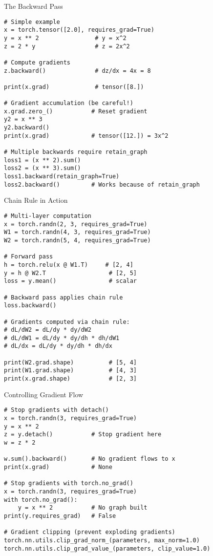 \documentclass[aspectratio=169,10pt]{beamer}
\begin{document}
\begin{frame}[fragile]{The Backward Pass}
\begin{lstlisting}
# Simple example
x = torch.tensor([2.0], requires_grad=True)
y = x ** 2                # y = x^2
z = 2 * y                 # z = 2x^2

# Compute gradients
z.backward()              # dz/dx = 4x = 8

print(x.grad)             # tensor([8.])

# Gradient accumulation (be careful!)
x.grad.zero_()           # Reset gradient
y2 = x ** 3
y2.backward()
print(x.grad)            # tensor([12.]) = 3x^2

# Multiple backwards require retain_graph
loss1 = (x ** 2).sum()
loss2 = (x ** 3).sum()
loss1.backward(retain_graph=True)
loss2.backward()         # Works because of retain_graph
\end{lstlisting}
\end{frame}

\begin{frame}[fragile]{Chain Rule in Action}
\begin{lstlisting}
# Multi-layer computation
x = torch.randn(2, 3, requires_grad=True)
W1 = torch.randn(4, 3, requires_grad=True)
W2 = torch.randn(5, 4, requires_grad=True)

# Forward pass
h = torch.relu(x @ W1.T)     # [2, 4]
y = h @ W2.T                  # [2, 5]
loss = y.mean()               # scalar

# Backward pass applies chain rule
loss.backward()

# Gradients computed via chain rule:
# dL/dW2 = dL/dy * dy/dW2
# dL/dW1 = dL/dy * dy/dh * dh/dW1
# dL/dx = dL/dy * dy/dh * dh/dx

print(W2.grad.shape)          # [5, 4]
print(W1.grad.shape)          # [4, 3]
print(x.grad.shape)           # [2, 3]
\end{lstlisting}
\end{frame}

\begin{frame}[fragile]{Controlling Gradient Flow}
\begin{lstlisting}
# Stop gradients with detach()
x = torch.randn(3, requires_grad=True)
y = x ** 2
z = y.detach()           # Stop gradient here
w = z * 2

w.sum().backward()       # No gradient flows to x
print(x.grad)            # None

# Stop gradients with torch.no_grad()
x = torch.randn(3, requires_grad=True)
with torch.no_grad():
    y = x ** 2           # No graph built
print(y.requires_grad)   # False

# Gradient clipping (prevent exploding gradients)
torch.nn.utils.clip_grad_norm_(parameters, max_norm=1.0)
torch.nn.utils.clip_grad_value_(parameters, clip_value=1.0)
\end{lstlisting}
\end{frame}
\end{document}
